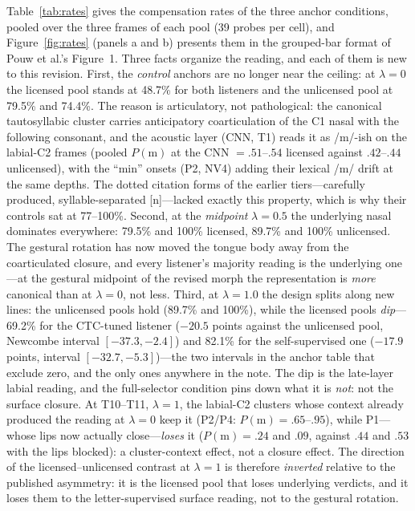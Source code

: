 \documentclass[11pt,a4paper]{article}
\newcommand{\lam}{\lambda}
\begin{document}
Table~\ref{tab:rates} gives the compensation rates of the three anchor
conditions, pooled over the three frames of each pool (39 probes per
cell), and Figure~\ref{fig:rates} (panels a and b) presents them in the
grouped-bar format of Pouw et al.'s Figure~1. Three facts organize
the reading, and each of them is new to this revision. First, the
\emph{control} anchors are no longer near the ceiling: at $\lam=0$ the
licensed pool stands at 48.7\% for both listeners and the unlicensed
pool at 79.5\% and 74.4\%. The reason is articulatory, not
pathological: the canonical tautosyllabic cluster carries anticipatory
coarticulation of the C1 nasal with the following consonant, and the
acoustic layer (CNN, T1) reads it as /m/-ish on the labial-C2 frames
(pooled $P(\mathrm{m})$ at the CNN $=.51$--$.54$ licensed against
$.42$--$.44$ unlicensed), with the ``min'' onsets (P2, NV4) adding
their lexical /m/ drift at the same depths. The dotted citation forms
of the earlier tiers---carefully produced, syllable-separated
[n]---lacked exactly this property, which is why their controls sat
at 77--100\%. Second, at the \emph{midpoint} $\lam=0.5$ the
underlying nasal dominates everywhere: 79.5\% and 100\% licensed,
89.7\% and 100\% unlicensed. The gestural rotation has now moved
the tongue body away from the coarticulated closure, and every
listener's majority reading is the underlying one---at the gestural
midpoint of the revised morph the representation is \emph{more}
canonical than at $\lam=0$, not less. Third, at $\lam=1.0$ the design
splits along new lines: the unlicensed pools hold (89.7\% and
100\%), while the licensed pools \emph{dip}---69.2\% for the
CTC-tuned listener ($-20.5$ points against the unlicensed pool,
Newcombe interval $[-37.3, -2.4]$) and 82.1\% for the
self-supervised one ($-17.9$ points, interval $[-32.7, -5.3]$)---the
two intervals in the anchor table that exclude zero, and the only
ones anywhere in the note. The dip is the late-layer labial reading,
and the full-selector condition pins down what it is \emph{not}:
not the surface closure. At T10--T11, $\lam=1$, the labial-C2
clusters whose context already produced the reading at $\lam=0$ keep
it (P2/P4: $P(\mathrm{m}) = .65$--$.95$), while P1---whose lips now
actually close---\emph{loses} it ($P(\mathrm{m}) = .24$ and $.09$,
against $.44$ and $.53$ with the lips blocked): a cluster-context
effect, not a closure effect. The direction of the licensed--unlicensed
contrast at $\lam=1$ is therefore \emph{inverted} relative to the
published asymmetry: it is the licensed pool that loses underlying
verdicts, and it loses them to the letter-supervised surface reading,
not to the gestural rotation.
\end{document}
